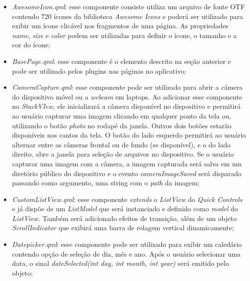 \begin{itemize}
	\item \textit{AwesomeIcon.qml}: esse componente consiste utiliza um arquivo de fonte OTF contendo 720 ícones da biblioteca \textit{Awesome Icons} e poderá ser utilizado para exibir um ícone clicável nos fragmentos de uma página. As propriedades \textit{name}, \textit{size} e \textit{color} podem ser utilizadas para definir o ícone, o tamanho e a cor do ícone;

	\item \textit{BasePage.qml}: esse componente é o elemento descrito na seção anterior e pode ser utilizado pelos plugins nas páginas no aplicativo;

	\item \textit{CameraCapture.qml}: esse componente pode ser utilizado para abrir a câmera do dispositivo móvel ou a \textit{webcam} em laptops. Ao adicionar esse componente no \textit{StackVIew}, ele inicializará a câmera disponível no dispositivo e permitirá ao usuário capturar uma imagem clicando em qualquer ponto da tela ou, utilizando o botão \textit{photo} no rodapé da janela. Outros dois botões estarão disponíveis nos cantos da tela. O botão do lado esquerdo permitirá ao usuário alternar entre as câmeras frontal ou de fundo (se disponível), e o do lado direito, abre a janela para seleção de arquivos no dispositivo. Se o usuário capturar uma imagem com a câmera, a imagem capturada será salva em um diretório público do dispositivo e o evento \textit{cameraImageSaved} será disparado passando como argumento, uma string com o \textit{path} da imagem;

	\item \textit{CustomListView.qml}: esse componente \textit{extends} o \textit{ListView} do \textit{Quick Controls} e já dispõe de um \textit{ListModel} que será instanciado e definido como \textit{model} do \textit{ListView}. Também será adicionado efeitos de transição, além de um objeto \textit{ScrollIndicator} que exibirá uma barra de rolagem vertical dinamicamente;

	\item \textit{Datepicker.qml}: esse componente pode ser utilizado para exibir um caledário contendo opção de seleção de dia, mês e ano. Após o usuário selecionar uma data, o sinal \textit{dateSelected(int day, int month, int year)} será emitido pelo objeto;


\end{itemize}
